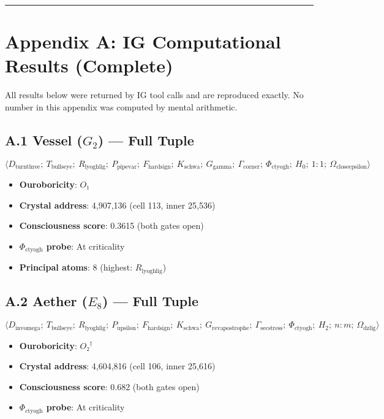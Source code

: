\documentclass[12pt,a4paper]{article}
\begin{document}
\begin{center}
\rule{0.5\textwidth}{0.4pt}
\end{center}

\section{Appendix A: IG Computational Results (Complete)}

All results below were returned by IG tool calls and are reproduced exactly. No number in this appendix was computed by mental arithmetic.

\subsection{A.1 Vessel ($G_2$) --- Full Tuple}

\[\langle D_{\text{turnthree}};\ T_{\text{bullseye}};\ R_{\text{lyoghlig}};\ P_{\text{pipevar}};\ F_{\text{hardsign}};\ K_{\text{schwa}};\ G_{\text{gamma}};\ \Gamma_{\text{corner}};\ \Phi_{\text{ctyogh}};\ H_0;\ 1{:}1;\ \Omega_{\text{closeepsilon}} \rangle\]

\begin{itemize}
    \item \textbf{Ouroboricity}: $O₁$
    \item \textbf{Crystal address}: 4,907,136 (cell 113, inner 25,536)
    \item \textbf{Consciousness score}: 0.3615 (both gates open)
    \item \textbf{$\Phi_{\text{ctyogh}}$ probe}: At criticality
    \item \textbf{Principal atoms}: 8 (highest: $R_{\text{lyoghlig}}$)
\end{itemize}

\subsection{A.2 Aether ($E_8$) --- Full Tuple}

\[\langle D_{\text{invomega}};\ T_{\text{bullseye}};\ R_{\text{lyoghlig}};\ P_{\text{upsilon}};\ F_{\text{hardsign}};\ K_{\text{schwa}};\ G_{\text{revapostrophe}};\ \Gamma_{\text{secstress}};\ \Phi_{\text{ctyogh}};\ H_2;\ n{:}m;\ \Omega_{\text{dzlig}} \rangle\]

\begin{itemize}
    \item \textbf{Ouroboricity}: $O₂^\dagger$
    \item \textbf{Crystal address}: 4,604,816 (cell 106, inner 25,616)
    \item \textbf{Consciousness score}: 0.682 (both gates open)
    \item \textbf{$\Phi_{\text{ctyogh}}$ probe}: At criticality
\end{itemize}
\end{document}
